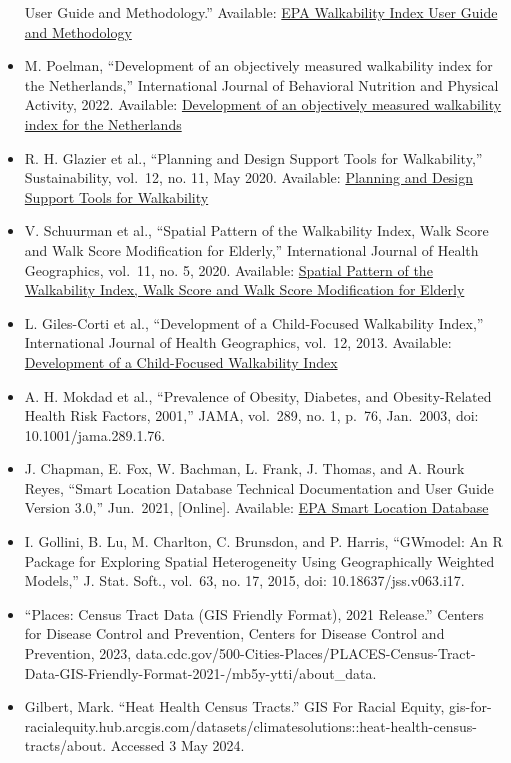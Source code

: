 \documentclass[
]{article}
\begin{document}
\begin{itemize}
  User Guide and Methodology.'' Available:
  \href{https://www.epa.gov/smartgrowth/national-walkability-index-user-guide-and-methodology}{EPA
  Walkability Index User Guide and Methodology}
\item
  M. Poelman, ``Development of an objectively measured walkability index
  for the Netherlands,'' International Journal of Behavioral Nutrition
  and Physical Activity, 2022. Available:
  \href{https://ijbnpa.biomedcentral.com/articles/10.1186/s12966-022-01270-8}{Development
  of an objectively measured walkability index for the Netherlands}
\item
  R. H. Glazier et al., ``Planning and Design Support Tools for
  Walkability,'' Sustainability, vol.~12, no. 11, May 2020. Available:
  \href{https://www.mdpi.com/2071-1050/12/11/4405}{Planning and Design
  Support Tools for Walkability}
\item
  V. Schuurman et al., ``Spatial Pattern of the Walkability Index, Walk
  Score and Walk Score Modification for Elderly,'' International Journal
  of Health Geographics, vol.~11, no. 5, 2020. Available:
  \href{https://www.mdpi.com/2220-9964/11/5/279}{Spatial Pattern of the
  Walkability Index, Walk Score and Walk Score Modification for Elderly}
\item
  L. Giles-Corti et al., ``Development of a Child-Focused Walkability
  Index,'' International Journal of Health Geographics, vol.~12, 2013.
  Available:
  \href{https://ij-healthgeographics.biomedcentral.com/articles/10.1186/1476-072X-12-61}{Development
  of a Child-Focused Walkability Index}
\item
  A. H. Mokdad et al., ``Prevalence of Obesity, Diabetes, and
  Obesity-Related Health Risk Factors, 2001,'' JAMA, vol.~289, no. 1,
  p.~76, Jan.~2003, doi: 10.1001/jama.289.1.76.
\item
  J. Chapman, E. Fox, W. Bachman, L. Frank, J. Thomas, and A. Rourk
  Reyes, ``Smart Location Database Technical Documentation and User
  Guide Version 3.0,'' Jun.~2021, {[}Online{]}. Available:
  \href{https://www.epa.gov/system/files/documents/2023-10/epa_sld_3.0_technicaldocumentationuserguide_may2021_0.pdf}{EPA
  Smart Location Database}
\item
  I. Gollini, B. Lu, M. Charlton, C. Brunsdon, and P. Harris, ``GWmodel:
  An R Package for Exploring Spatial Heterogeneity Using Geographically
  Weighted Models,'' J. Stat. Soft., vol.~63, no. 17, 2015, doi:
  10.18637/jss.v063.i17.
\item
  ``Places: Census Tract Data (GIS Friendly Format), 2021 Release.''
  Centers for Disease Control and Prevention, Centers for Disease
  Control and Prevention, 2023,
  data.cdc.gov/500-Cities-Places/PLACES-Census-Tract-Data-GIS-Friendly-Format-2021-/mb5y-ytti/about\_data.
\item
  Gilbert, Mark. ``Heat Health Census Tracts.'' GIS For Racial Equity,
  gis-for-racialequity.hub.arcgis.com/datasets/climatesolutions::heat-health-census-tracts/about.
  Accessed 3 May 2024.
\end{itemize}
\end{document}
